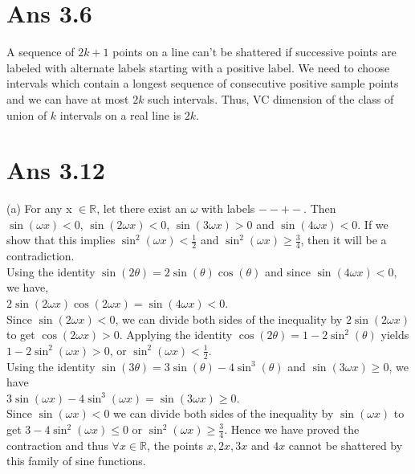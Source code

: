 \documentclass[10pt]{article}
\begin{document}
\section*{Ans 3.6}
\begin{flushleft}
A sequence of $2k+1$ points on a line can't be shattered if successive points are labeled with alternate labels starting with a positive label. We need to choose intervals which contain a longest sequence of consecutive positive sample points and we can have at most $2k$ such intervals. Thus, VC dimension of the class of union of $k$ intervals on a real line is $2k$.
\end{flushleft}
\section*{Ans 3.12}
\begin{flushleft}
(a) For any x $\in \mathbb{R}$, let there exist an $\omega$ with labels $- - + -$. Then $\sin(\omega x) < 0$, $\sin(2 \omega x) < 0$, $\sin(3 \omega x) > 0$ and $\sin(4 \omega x) < 0$. If we show that this implies $\sin^2(\omega x) < \frac{1}{2}$ and $\sin^2(\omega x) \geq \frac{3}{4}$, then it will be a contradiction.\\
\vspace{0.5em}
Using the identity $\sin(2\theta) = 2 \sin(\theta) \cos(\theta)$ and since $\sin(4 \omega x) < 0$, we have,\\
\hspace{2em} $2\sin(2 \omega x) \cos(2 \omega x) = \sin(4 \omega x) < 0$.\\
\vspace{0.5em}
Since $\sin(2 \omega x) < 0$, we can divide both sides of the inequality by $2\sin(2 \omega x)$ to get $\cos(2\omega x) > 0$. Applying the identity $\cos(2\theta) = 1 - 2\sin^2(\theta)$ yields $1 - 2\sin^2(\omega x) > 0$, or $\sin^2(\omega x) < \frac{1}{2}$. \\
\vspace{0.5em}
 Using the identity $\sin(3\theta) = 3 \sin(\theta) - 4 \sin^3(\theta)$ and $\sin(3 \omega x) \geq 0$, we have\\
 \hspace{2em} $3 \sin(\omega x) - 4 \sin^3(\omega x) = \sin(3 \omega x) \geq 0 $.\\
 \vspace{0.5em}
 Since $\sin(\omega x) < 0$ we can divide both sides of the inequality by $\sin(\omega x)$ to get $3 - 4 \sin^2(\omega x) \leq 0$ or $\sin^2(\omega x) \geq \frac{3}{4}$. Hence we have proved the contraction and thus $\forall x \in \mathbb{R}$, the points $x, 2x, 3x$ and $4x$ cannot be shattered by this family of sine functions.\\

\end{flushleft}
\end{document}
